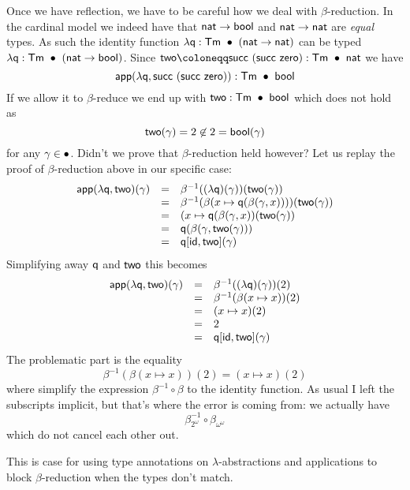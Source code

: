 Once we have reflection, we have to be careful how we deal with
\(\beta\)-reduction. In the cardinal model we indeed have that
\(\mathsf{nat} \to \mathsf{bool}\) and \(\mathsf{nat} \to \mathsf{nat}\) are \emph{equal} types.
As such the identity function \(\lambda \mathsf{q} : \mathsf{Tm}\ \bullet\ (\mathsf{nat} \to \mathsf{nat})\)
can be typed \(\lambda \mathsf{q} : \mathsf{Tm}\ \bullet\ (\mathsf{nat} \to \mathsf{bool})\).
Since \(\ctwo \coloneqq \csucc\ (\csucc\ \czero) : \CTm\ \ctxempty\ \nat\)
we have
\[
  \mathsf{app}(\lambda \mathsf{q}, \mathsf{succ}\ (\mathsf{succ}\ \mathsf{zero})) : \mathsf{Tm}\ \bullet\ \mathsf{bool}
\]
If we allow it to \(\beta\)-reduce we end up with
\(\ctwo : \CTm\ \ctxempty\ \bool\) which does not hold as
\[
  \mathsf{two}(\gamma) = 2 \not\in 2 = \mathsf{bool}(\gamma)
\]
for any \(\gamma \in \bullet\).
Didn't we prove that \(\beta\)-reduction held however?
Let us replay the proof of \(\beta\)-reduction above in our specific case:
\[
  \begin{array}{rcl}
    \mathsf{app}(\lambda \mathsf{q}, \mathsf{two})(\gamma)
    &=& \beta^{-1}((\lambda \mathsf{q})(\gamma))(\mathsf{two}(\gamma)) \\
    &=& \beta^{-1}(\beta(x \mapsto \mathsf{q}(\beta(\gamma,x))))(\mathsf{two}(\gamma)) \\
    &=& (x \mapsto \mathsf{q}(\beta(\gamma,x))(\mathsf{two}(\gamma)) \\
    &=& \mathsf{q}(\beta(\gamma, \mathsf{two}(\gamma))) \\
    &=& \mathsf{q}[\mathsf{id}, \mathsf{two}](\gamma)
  \end{array}
\]
Simplifying away \(\mathsf{q}\) and \(\mathsf{two}\) this becomes
\[
  \begin{array}{rcl}
    \mathsf{app}(\lambda \mathsf{q}, \mathsf{two})(\gamma)
    &=& \beta^{-1}((\lambda \mathsf{q})(\gamma))(2) \\
    &=& \beta^{-1}(\beta(x \mapsto x))(2) \\
    &=& (x \mapsto x)(2) \\
    &=& 2 \\
    &=& \mathsf{q}[\mathsf{id}, \mathsf{two}](\gamma)
  \end{array}
\]
The problematic part is the equality
\[
  \beta^{-1}(\beta(x \mapsto x))(2) = (x \mapsto x)(2)
\]
where simplify the expression \(\beta^{-1} \circ \beta\) to the identity
function. As usual I left the subscripts implicit, but that's where the error
is coming from: we actually have
\[
  \beta_{2^\omega}^{-1} \circ \beta_{\omega^\omega}
\]
which do not cancel each other out.

This is case for using type annotations on \(\lambda\)-abstractions and
applications to block \(\beta\)-reduction when the types don't match.

